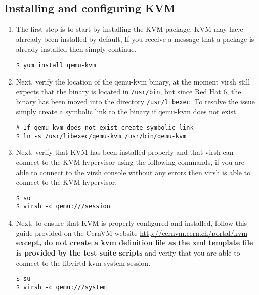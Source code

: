 \subsection{Installing and configuring KVM}
\label{sec:rhkvm}
\begin{enumerate}
\item	The first step is to start by installing the KVM package, KVM may have alrready been installed by default, If
			you receive a message that a package is already installed then simply continue.

\lstset{language=bash,caption=Install KVM}
\begin{lstlisting}
$ yum install qemu-kvm
\end{lstlisting}

\item	Next, verify the location of the qemu-kvm binary, at the moment virsh still expects that the binary is located
			in \verb|/usr/bin|, but since Red Hat 6, the binary has been moved into the directory \verb|/usr/libexec|.
			To resolve the issue simply create a symbolic link to the binary if qemu-kvm does not exist.
			
\lstset{language=bash,caption=Symbolic Link to qemu-kvm}
\begin{lstlisting}
# If qemu-kvm does not exist create symbolic link
$ ln -s /usr/libexec/qemu-kvm /usr/bin/qemu-kvm
\end{lstlisting}

\item	Next, verify that KVM has been installed properly and that virsh can connect to the KVM hypervisor using the
			following commands, if you are able to connect to the virsh console without any errors then virsh is able
			to connect to the KVM hypervisor.

\lstset{language=bash,caption=Verify that virsh can Access KVM}
\begin{lstlisting}
$ su
$ virsh -c qemu:///session
\end{lstlisting}

\item 	Next, to ensure that KVM is properly configured and installed, follow this guide provided on the CernVM website
			\url{http://cernvm.cern.ch/portal/kvm} {\bf except, do not create a kvm definition file as the xml template file
			is provided by the test suite scripts} and verify that you are able to connect to the libvirtd kvm system session.
		
\lstset{language=bash,caption=Verify that KVM is Properly Configured}
\begin{lstlisting}
$ su
$ virsh -c qemu:///system 
\end{lstlisting}


\end{enumerate}
